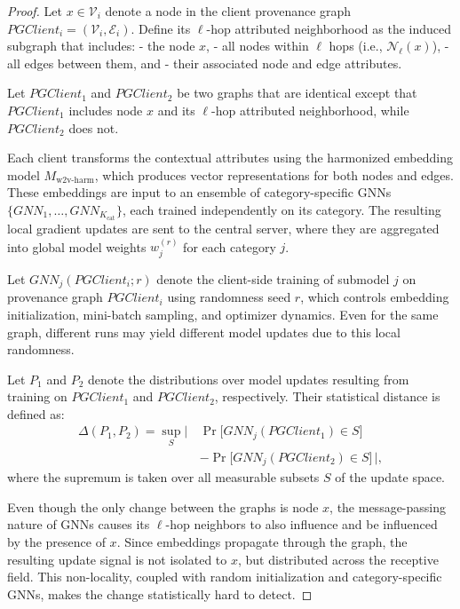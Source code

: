     \begin{proof}
    Let \(x \in \mathcal{V}_i\) denote a node in the client provenance graph \(PGClient_i = (\mathcal{V}_i, \mathcal{E}_i)\). Define its \(\ell\)-hop attributed neighborhood as the induced subgraph that includes:
    - the node \(x\),
    - all nodes within \(\ell\) hops (i.e., \(\mathcal{N}_\ell(x)\)),
    - all edges between them, and
    - their associated node and edge attributes.
    
    Let \(PGClient_1\) and \(PGClient_2\) be two graphs that are identical except that \(PGClient_1\) includes node \(x\) and its \(\ell\)-hop attributed neighborhood, while \(PGClient_2\) does not.
    
    Each client transforms the contextual attributes using the harmonized embedding model \(M_{\text{w2v-harm}}\), which produces vector representations for both nodes and edges. These embeddings are input to an ensemble of category-specific GNNs \(\{GNN_1, \ldots, GNN_{K_{\text{cat}}}\}\), each trained independently on its category. The resulting local gradient updates are sent to the central server, where they are aggregated into global model weights \(w_j^{(r)}\) for each category \(j\).
    
    Let \(GNN_j(PGClient_i; r)\) denote the client-side training of submodel \(j\) on provenance graph \(PGClient_i\) using randomness seed \(r\), which controls embedding initialization, mini-batch sampling, and optimizer dynamics. Even for the same graph, different runs may yield different model updates due to this local randomness.
    
    Let \(P_1\) and \(P_2\) denote the distributions over model updates resulting from training on \(PGClient_1\) and \(PGClient_2\), respectively. Their statistical distance is defined as:
    \begin{align*}
    \Delta(P_1, P_2) = \sup_{S} \big|\, 
    & \Pr\big[GNN_j(PGClient_1) \in S\big] \\
    & - \Pr\big[GNN_j(PGClient_2) \in S\big] \,\big|,
    \end{align*}
    where the supremum is taken over all measurable subsets \(S\) of the update space.
    
    Even though the only change between the graphs is node \(x\), the message-passing nature of GNNs causes its \(\ell\)-hop neighbors to also influence and be influenced by the presence of \(x\). Since embeddings propagate through the graph, the resulting update signal is not isolated to \(x\), but distributed across the receptive field. This non-locality, coupled with random initialization and category-specific GNNs, makes the change statistically hard to detect.
    

\end{proof}
